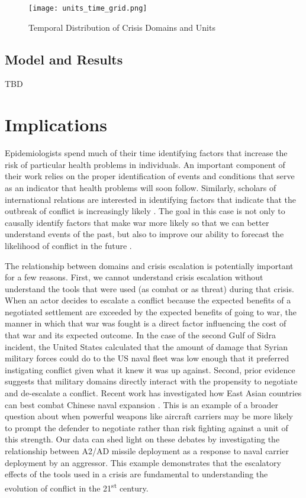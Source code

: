 \documentclass[12pt,letterpaper]{article}
\begin{document}
		\begin{figure}[H]
			\centering
			\texttt{[image: units\_time\_grid.png]}
			\caption{Temporal Distribution of Crisis Domains and Units}
			\label{fig:summary_timeseries}
		\end{figure}
	
	\subsection{Model and Results}
		TBD

\section{Implications}
	Epidemiologists spend much of their time identifying factors that increase the risk of particular health problems in individuals. An important component of their work relies on the proper identification of events and conditions that serve as an indicator that health problems will soon follow. Similarly, scholars of international relations are interested in identifying factors that indicate that the outbreak of conflict is increasingly likely \citep{senese_stepswarempirical_2008}. The goal in this case is not only to causally identify factors that make war more likely so that we can better understand events of the past, but also to improve our ability to forecast the likelihood of conflict in the future \citep{valeriano_pathwaysinterstatewar_2010}.
	
	The relationship between domains and crisis escalation is potentially important for a few reasons. First, we cannot understand crisis escalation without understand the tools that were used (as combat or as threat) during that crisis. When an actor decides to escalate a conflict because the expected benefits of a negotiated settlement are exceeded by the expected benefits of going to war, the manner in which that war was fought is a direct factor influencing the cost of that war and its expected outcome. In the case of the second Gulf of Sidra incident, the United States calculated that the amount of damage that Syrian military forces could do to the US naval fleet was low enough that it preferred instigating conflict given what it knew it was up against. Second, prior evidence suggests that military domains directly interact with the propensity to negotiate and de-escalate a conflict. Recent work has investigated how East Asian countries can best combat Chinese naval expansion \citep{beckley_emergingmilitarybalance_2017}. This is an example of a broader question about when powerful weapons like aircraft carriers may be more likely to prompt the defender to negotiate rather than risk fighting against a unit of this strength. Our data can shed light on these debates by investigating the relationship between A2/AD missile deployment as a response to naval carrier deployment by an aggressor. This example demonstrates that the escalatory effects of the tools used in a crisis are fundamental to understanding the evolution of conflict in the 21\textsuperscript{st} century.
	
\end{document}
